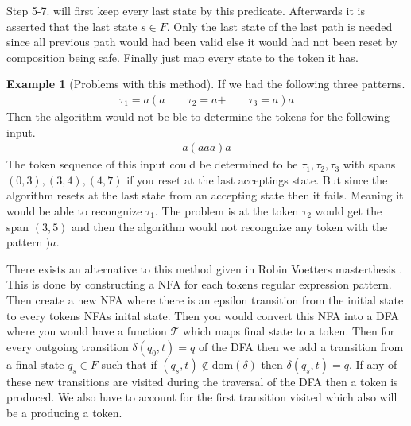 \documentclass[a4paper,12pt]{article}
\theoremstyle{definition}
\newtheorem{example}{Example}[section]
\begin{document}
Step 5-7. will first keep every last state by this predicate. Afterwards it is asserted that the last state $s \in F$. Only the last state of the last path is needed since all previous path would had been valid else it would had not been reset by composition being safe. Finally just map every state to the token it has.

\begin{example}[Problems with this method]\label{ex:overlap}
  If we had the following three patterns.
  \begin{align*}
    \tau_1 = a(a \qquad \tau_2 = a\text{+} \qquad \tau_3 = a)a
  \end{align*}
  Then the algorithm would not be ble to determine the tokens for the following input.
  \begin{align*}
    a(aaa)a
  \end{align*}
  The token sequence of this input could be determined to be $\tau_1, \tau_2, \tau_3$ with spans $(0, 3), (3, 4), (4, 7)$ if you reset at the last acceptings state. But since the algorithm resets at the last state from an accepting state then it fails. Meaning it would be able to recongnize $\tau_1$. The problem is at the token $\tau_2$ would get the span $(3, 5)$ and then the algorithm would not recongnize any token with the pattern $)a$.
\end{example}
\noindent There exists an alternative to this method given in Robin Voetters masterthesis \cite[13-16]{voetter2021}. This is done by constructing a NFA for each tokens regular expression pattern. Then create a new NFA where there is an epsilon transition from the initial state to every tokens NFAs inital state. Then you would convert this NFA into a DFA where you would have a function $\mathcal{T}$ which maps final state to a token. Then for every outgoing transition $\delta(q_0, t) = q$ of the DFA then we add a transition from a final state $q_s \in F$ such that if $(q_s, t) \notin \text{dom}(\delta)$ then $\delta(q_s, t) = q$. If any of these new transitions are visited during the traversal of the DFA then a token is produced. We also have to account for the first transition visited which also will be a producing a token.
\end{document}
